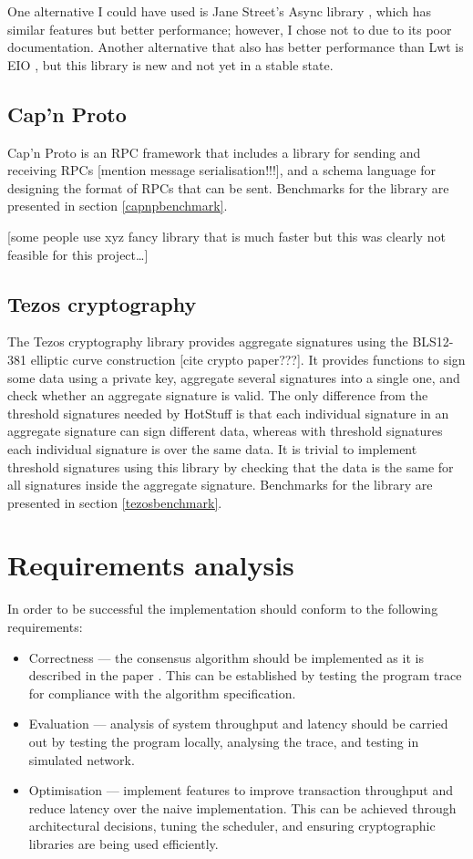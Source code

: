 One alternative I could have used is Jane Street's Async library \cite{noauthor_async_nodate}, which has similar features but better performance; however, I chose not to due to its poor documentation. Another alternative that also has better performance than Lwt is EIO \cite{noauthor_eio_2023}, but this library is new and not yet in a stable state.

\subsection{Cap'n Proto}
Cap'n Proto  \cite{noauthor_capn_nodate} is an RPC framework that includes a library for sending and receiving RPCs [mention message serialisation!!!], and a schema language for designing the format of RPCs that can be sent. Benchmarks for the library are presented in section \ref{capnpbenchmark}.

[some people use xyz fancy library that is much faster but this was clearly not feasible for this project\dots]

\subsection{Tezos cryptography} \label{tezos}
The Tezos cryptography library \cite{noauthor_tezos_nodate} provides aggregate signatures using the BLS12-381 elliptic curve construction [cite crypto paper???]. It provides functions to sign some data using a private key, aggregate several signatures into a single one, and check whether an aggregate signature is valid. The only difference from the threshold signatures needed by HotStuff is that each individual signature in an aggregate signature can sign different data, whereas with threshold signatures each individual signature is over the same data. It is trivial to implement threshold signatures using this library by checking that the data is the same for all signatures inside the aggregate signature. Benchmarks for the library are presented in section \ref{tezosbenchmark}.

\section{Requirements analysis} \label{requirements}

In order to be successful the implementation should conform to the following requirements:
\begin{itemize}
	\item Correctness --- the consensus algorithm should be implemented as it is described in the paper \cite{yin2019hotstuff}. This can be established by testing the program trace for compliance with the algorithm specification.
	\item Evaluation --- analysis of system throughput and latency should be carried out by testing the program locally, analysing the trace, and testing in simulated network.
	\item Optimisation --- implement features to improve transaction throughput and reduce latency over the naive implementation. This can be achieved through architectural decisions, tuning the scheduler, and ensuring cryptographic libraries are being used efficiently.
\end{itemize}

